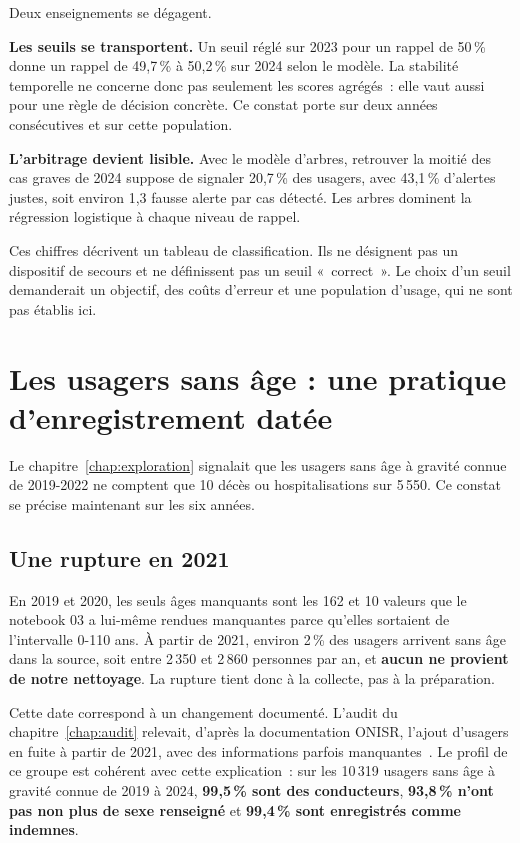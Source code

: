 Deux enseignements se dégagent.

\textbf{Les seuils se transportent.} Un seuil réglé sur 2023 pour un rappel de 50\,\%
donne un rappel de 49,7\,\% à 50,2\,\% sur 2024 selon le modèle. La stabilité temporelle
ne concerne donc pas seulement les scores agrégés~: elle vaut aussi pour une règle de
décision concrète. Ce constat porte sur deux années consécutives et sur cette population.

\textbf{L'arbitrage devient lisible.} Avec le modèle d'arbres, retrouver la moitié des
cas graves de 2024 suppose de signaler 20,7\,\% des usagers, avec 43,1\,\% d'alertes
justes, soit environ 1,3 fausse alerte par cas détecté. Les arbres dominent la
régression logistique à chaque niveau de rappel.

Ces chiffres décrivent un tableau de classification. Ils ne désignent pas un dispositif
de secours et ne définissent pas un seuil «~correct~». Le choix d'un seuil demanderait
un objectif, des coûts d'erreur et une population d'usage, qui ne sont pas établis ici.

\section{Les usagers sans âge : une pratique d'enregistrement datée}
Le chapitre~\ref{chap:exploration} signalait que les usagers sans âge à gravité connue
de 2019-2022 ne comptent que 10 décès ou hospitalisations sur 5\,550. Ce constat se
précise maintenant sur les six années.


\subsection{Une rupture en 2021}
En 2019 et 2020, les seuls âges manquants sont les 162 et 10 valeurs que le notebook 03
a lui-même rendues manquantes parce qu'elles sortaient de l'intervalle 0-110 ans.
À partir de 2021, environ 2\,\% des usagers arrivent sans âge dans la source, soit
entre 2\,350 et 2\,860 personnes par an, et \textbf{aucun ne provient de notre
nettoyage}. La rupture tient donc à la collecte, pas à la préparation.

Cette date correspond à un changement documenté. L'audit du chapitre~\ref{chap:audit}
relevait, d'après la documentation ONISR, l'ajout d'usagers en fuite à partir de 2021,
avec des informations parfois manquantes~\cite{doc-onisr}. Le profil de ce groupe est
cohérent avec cette explication~: sur les 10\,319 usagers sans âge à gravité connue de
2019 à 2024, \textbf{99,5\,\% sont des conducteurs}, \textbf{93,8\,\% n'ont pas non plus
de sexe renseigné} et \textbf{99,4\,\% sont enregistrés comme indemnes}.

